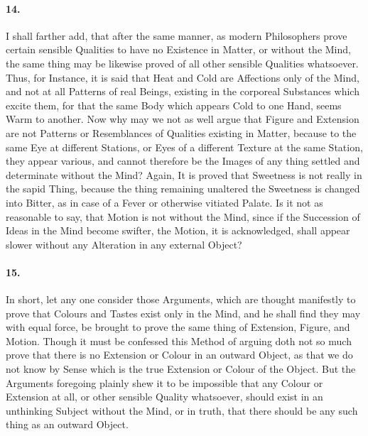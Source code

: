 \documentclass[]{article}
\newenvironment{sectionbody}{\begin{multicols}{2}}{\end{multicols}}
\begin{document}
\begin{sectionbody}
\paragraph{14.} I shall farther add, that after the same manner, as modern
Philosophers prove certain sensible Qualities to have no
Existence in Matter, or without the Mind, the same thing may be
likewise proved of all other sensible Qualities whatsoever.
Thus, for Instance, it is said that Heat and Cold are Affections
only of the Mind, and not at all Patterns of real Beings,
existing in the corporeal Substances which excite them, for that
the same Body which appears Cold to one Hand, seems Warm to
another.  Now why may we not as well argue that Figure and
Extension are not Patterns or Resemblances of Qualities existing
in Matter, because to the same Eye at different Stations, or Eyes
of a different Texture at the same Station, they appear various,
and cannot therefore be the Images of any thing settled and
determinate without the Mind?  Again, It is proved that Sweetness
is not really in the sapid Thing, because the thing remaining
unaltered the Sweetness is changed into Bitter, as in case of a
Fever or otherwise vitiated Palate.  Is it not as reasonable to
say, that Motion is not without the Mind, since if the Succession
of Ideas in the Mind become swifter, the Motion, it is
acknowledged, shall appear slower without any Alteration in any
external Object?



\paragraph{15.} In short, let any one consider those Arguments, which are thought
manifestly to prove that Colours and Tastes exist only in the
Mind, and he shall find they may with equal force, be brought to
prove the same thing of Extension, Figure, and Motion.  Though it
must be confessed this Method of arguing doth not so much prove
that there is no Extension or Colour in an outward Object, as
that we do not know by Sense which is the true Extension or
Colour of the Object.  But the Arguments foregoing plainly shew
it to be impossible that any Colour or Extension at all, or other
sensible Quality whatsoever, should exist in an unthinking
Subject without the Mind, or in truth, that there should be any
such thing as an outward Object.




\end{sectionbody}
\end{document}
